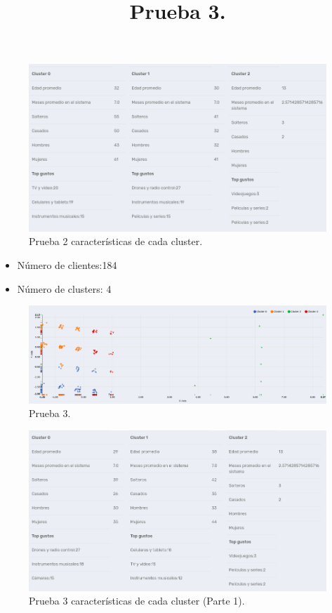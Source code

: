 \FloatBarrier
\begin{figure}[htbp!]
		\centering
			\includegraphics[width=1 \textwidth]{imagenes/pruebassistemarecom/cluster3_2}
		\caption{Prueba 2 características de cada cluster.}
\end{figure}
\FloatBarrier



\title{\textbf{Prueba 3.}}

\begin{itemize}
\item Número de clientes:184
\item Número de clusters: 4
\end{itemize}

\FloatBarrier
\begin{figure}[htbp!]
		\centering
			\includegraphics[width=1 \textwidth]{imagenes/pruebassistemarecom/cluster4_1}
		\caption{Prueba 3.}
\end{figure}
\FloatBarrier

\FloatBarrier
\begin{figure}[htbp!]
		\centering
			\includegraphics[width=1 \textwidth]{imagenes/pruebassistemarecom/cluster4_2}
		\caption{Prueba 3 características de cada cluster (Parte 1).}
\end{figure}
\FloatBarrier

